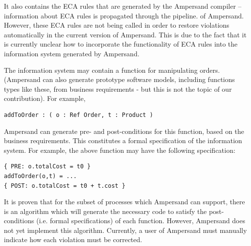 \documentclass[12pt]{report}
\begin{document}
It also contains the ECA rules that are generated by the Ampersand compiler --
information about ECA rules is propagated
through the pipeline. 
of
Ampersand. However, these ECA rules are not being called in order to restore
violations automatically in the current version of Ampersand. This is due to the
fact that it is currently unclear how to incorporate the functionality of ECA
rules into the information system generated by Ampersand. 

The information system may contain a function for manipulating orders. (Ampersand can also generate
prototype software models, including functions types like these, from business
requirements - but this is not the topic of our contribution). For example,

\begin{verbatim}
addToOrder : ( o : Ref Order, t : Product )
\end{verbatim}

Ampersand can generate pre- and post-conditions for this function, based on the
business requirements. This constitutes a formal specification of the
information system. For example, the above function may have the following specification:

\begin{verbatim}
{ PRE: o.totalCost = t0 } 
addToOrder(o,t) = ...
{ POST: o.totalCost = t0 + t.cost } 
\end{verbatim}

It is proven  
%
%
that for the subset of processes which Ampersand can support, there is an
algorithm which will generate the necessary code to satisfy the post-conditions
(i.e. 
formal specifications) of each function. However, Ampersand does not yet
implement this algorithm. Currently, a user of Ampersand must manually indicate
how each violation must be corrected.
\end{document}
